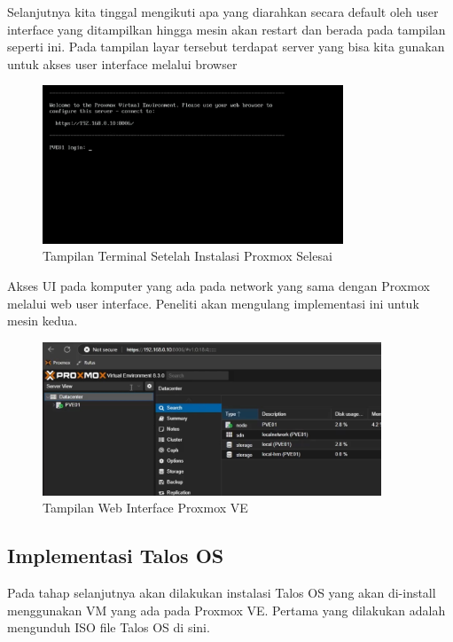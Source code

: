 Selanjutnya kita tinggal mengikuti apa yang diarahkan secara default oleh user interface yang ditampilkan hingga mesin akan restart dan berada pada tampilan seperti ini.
Pada tampilan layar tersebut terdapat server yang bisa kita gunakan untuk akses user interface melalui browser
\begin{figure}[H]
  \centering
  \includegraphics[width=0.8\textwidth]{figures/proxmox-install-terminal-3.jpg}
  \caption{Tampilan Terminal Setelah Instalasi Proxmox Selesai}
  \label{fig:proxmox_terminal}
\end{figure}

Akses UI pada komputer yang ada pada network yang sama dengan Proxmox melalui web user interface.
Peneliti akan mengulang implementasi ini untuk mesin kedua.
\begin{figure}[H]
  \centering
  \includegraphics[width=0.9\textwidth]{figures/proxmox-install-web-ui-4.jpg}
  \caption{Tampilan Web Interface Proxmox VE}
  \label{fig:proxmox_webui}
\end{figure}

\subsection{Implementasi Talos OS}
Pada tahap selanjutnya akan dilakukan instalasi Talos OS yang akan di-install menggunakan VM yang ada pada Proxmox VE.
Pertama yang dilakukan adalah mengunduh ISO file Talos OS di sini.

